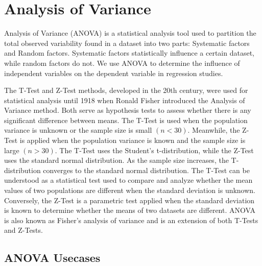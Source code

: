 

\section{Analysis of Variance}

Analysis of Variance (ANOVA) is a statistical analysis tool used to partition the total observed variability found in a dataset into two parts: Systematic factors and Random factors. Systematic factors statistically influence a certain dataset, while random factors do not. We use ANOVA to determine the influence of independent variables on the dependent variable in regression studies.

The T-Test and Z-Test methods, developed in the 20th century, were used for statistical analysis until 1918 when Ronald Fisher introduced the Analysis of Variance method. Both serve as hypothesis tests to assess whether there is any significant difference between means. The T-Test is used when the population variance is unknown or the sample size is small $(n < 30)$. Meanwhile, the Z-Test is applied when the population variance is known and the sample size is large $(n > 30)$. The T-Test uses the Student's t-distribution, while the Z-Test uses the standard normal distribution. As the sample size increases, the T-distribution converges to the standard normal distribution. The T-Test can be understood as a statistical test used to compare and analyze whether the mean values of two populations are different when the standard deviation is unknown. Conversely, the Z-Test is a parametric test applied when the standard deviation is known to determine whether the means of two datasets are different. ANOVA is also known as Fisher's analysis of variance and is an extension of both T-Tests and Z-Tests.

\subsection{ANOVA Usecases}

